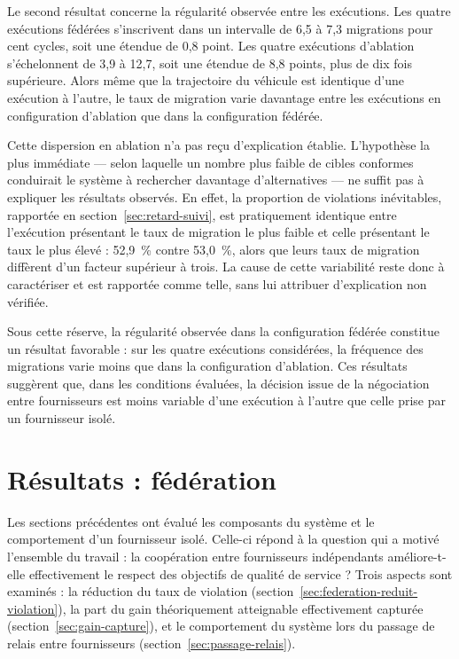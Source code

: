 Le second résultat concerne la régularité observée entre les exécutions. Les quatre exécutions fédérées s'inscrivent dans un intervalle de 6,5 à 7,3 migrations pour cent cycles, soit une étendue de 0,8 point. Les quatre exécutions d'ablation s'échelonnent de 3,9 à 12,7, soit une étendue de 8,8 points, plus de dix fois supérieure. Alors même que la trajectoire du véhicule est identique d'une exécution à l'autre, le taux de migration varie davantage entre les exécutions en configuration d'ablation que dans la configuration fédérée.

Cette dispersion en ablation n'a pas reçu d'explication établie. L'hypothèse la plus immédiate — selon laquelle un nombre plus faible de cibles conformes conduirait le système à rechercher davantage d'alternatives — ne suffit pas à expliquer les résultats observés. En effet, la proportion de violations inévitables, rapportée en section~\ref{sec:retard-suivi}, est pratiquement identique entre l'exécution présentant le taux de migration le plus faible et celle présentant le taux le plus élevé : 52,9~\% contre 53,0~\%, alors que leurs taux de migration diffèrent d'un facteur supérieur à trois. La cause de cette variabilité reste donc à caractériser et est rapportée comme telle, sans lui attribuer d'explication non vérifiée.

Sous cette réserve, la régularité observée dans la configuration fédérée constitue un résultat favorable : sur les quatre exécutions considérées, la fréquence des migrations varie moins que dans la configuration d'ablation. Ces résultats suggèrent que, dans les conditions évaluées, la décision issue de la négociation entre fournisseurs est moins variable d'une exécution à l'autre que celle prise par un fournisseur isolé.

\newpage
\section{Résultats : fédération}
\label{sec:resultats-federation}

Les sections précédentes ont évalué les composants du système et le comportement d'un fournisseur isolé. Celle-ci répond à la question qui a motivé l'ensemble du travail : la coopération entre fournisseurs indépendants améliore-t-elle effectivement le respect des objectifs de qualité de service ? Trois aspects sont examinés : la réduction du taux de violation (section~\ref{sec:federation-reduit-violation}), la part du gain théoriquement atteignable effectivement capturée (section~\ref{sec:gain-capture}), et le comportement du système lors du passage de relais entre fournisseurs (section~\ref{sec:passage-relais}).

